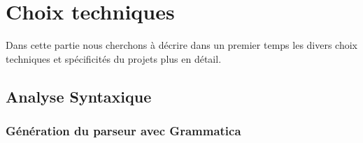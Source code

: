 \chapter{Choix techniques}

Dans cette partie nous cherchons à décrire dans un premier temps les divers choix techniques et spécificités du projets plus en détail.

\section{Analyse Syntaxique}

\subsection{Génération du parseur avec Grammatica}

